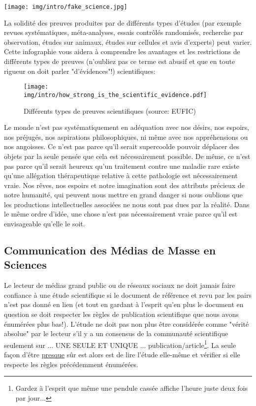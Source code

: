 	\begin{center}
		\texttt{[image: img/intro/fake\_science.jpg]}
	\end{center}
	
	La solidit\'e des preuves produites par de diff\'erents types d’\'etudes (par exemple revues syst\'ematiques, m\'eta-analyses, essais contrôl\'es randomis\'es, recherche par observation, \'etudes sur animaux, \'etudes sur cellules et avis d’experts) peut varier. Cette infographie vous aidera à comprendre les avantages et les restrictions de diff\'erents types de preuves (n'oubliez pas ce terme est abusif et que en toute rigueur on doit parler "d'évidences"!) scientifiques:
	\begin{figure}[H]
		\centering
		\texttt{[image: img/intro/how\_strong\_is\_the\_scientific\_evidence.pdf]}
		\caption[Diff\'erents types de preuves scientifiques]{Diff\'erents types de preuves scientifiques (source: EUFIC)}
	\end{figure}
	
	\begin{tcolorbox}[title=Remarque,colframe=black,arc=10pt]
	Le monde n’est pas systématiquement en adéquation avec nos désirs, nos espoirs, nos préjugés, nos aspirations philosophiques, ni même avec nos appréhensions ou nos angoisses. Ce n’est pas parce qu’il serait supercoolde pouvoir déplacer des objets par la seule pensée que cela est nécessairement possible. De même, ce n’est pas parce qu’il serait heureux qu’un traitement contre une maladie rare existe qu’une allégation thérapeutique relative à cette pathologie est nécessairement vraie. Nos rêves, nos espoirs et notre imagination sont des attributs précieux de notre humanité, qui peuvent nous mettre en grand danger si nous oublions que les productions intellectuelles associées ne nous sont pas dues par la réalité. Dans le même ordre d’idée, une chose n’est pas nécessairement vraie parce qu’il est envisageable qu’elle le soit.
	\end{tcolorbox}

	\pagebreak
	\subsection{Communication des M\'edias de Masse en Sciences}
	Le lecteur de m\'edias grand public ou de r\'eseaux sociaux ne doit jamais faire confiance à une \'etude scientifique si le document de r\'ef\'erence et revu par les pairs n'est pas donn\'e en lien (et tout en gardant à l'esprit qu'en plus le document en question se doit respecter les règles de publication scientifique que nous avons \'enum\'er\'ees plus bas!). L'\'etude ne doit pas non plus être consid\'er\'ee comme "v\'erit\'e absolue" par le lecteur s'il y a un consensus de la communaut\'e scientifique seulement sur ... UNE SEULE ET UNIQUE ... publication/article\footnote{Gardez à l'esprit que même une pendule cass\'ee affiche l'heure juste deux fois par jour...}. La seule façon d'être \underline{presque} sûr est alors est de lire l'\'etude elle-même et v\'erifier si elle respecte les règles pr\'ec\'edemment \'enum\'er\'ees.

